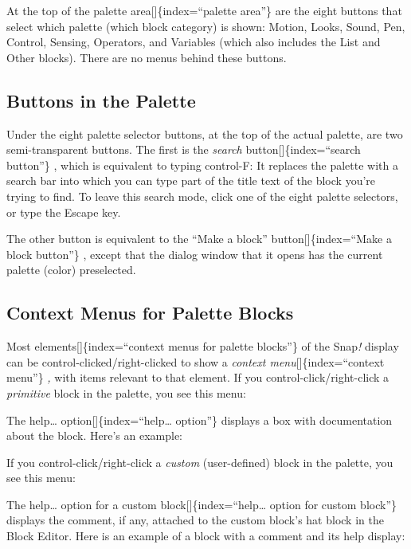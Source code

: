 \documentclass[
  letterpaper,
]{book}
\begin{document}
At the top of the palette area{[}{]}\{index=``palette area''\} are the
eight buttons that select which palette (which block category) is shown:
Motion, Looks, Sound, Pen, Control, Sensing, Operators, and Variables
(which also includes the List and Other blocks). There are no menus
behind these buttons.

\subsection{Buttons in the Palette}\label{buttons-in-the-palette}

Under the eight palette selector buttons, at the top of the actual
palette, are two semi-transparent buttons. The first is the
\emph{search} button{[}{]}\{index=``search button''\} , which is
equivalent to typing control-F: It replaces the palette with a search
bar into which you can type part of the title text of the block you're
trying to find. To leave this search mode, click one of the eight
palette selectors, or type the Escape key.

The other button is equivalent to the ``Make a block''
button{[}{]}\{index=``Make a block button''\} , except that the dialog
window that it opens has the current palette (color) preselected.

\subsection{Context Menus for Palette
Blocks}\label{context-menus-for-palette-blocks}

Most elements{[}{]}\{index=``context menus for palette blocks''\} of the
Snap\emph{!} display can be control-clicked/right-clicked to show a
\emph{context menu}{[}{]}\{index=``context menu''\} \emph{,} with items
relevant to that element. If you control-click/right-click a
\emph{primitive} block in the palette, you see this menu:

The help\ldots{} option{[}{]}\{index=``help\ldots{} option''\} displays
a box with documentation about the block. Here's an example:

If you control-click/right-click a \emph{custom} (user-defined) block in
the palette, you see this menu:

The help\ldots{} option for a custom block{[}{]}\{index=``help\ldots{}
option for custom block''\} displays the comment, if any, attached to
the custom block's hat block in the Block Editor. Here is an example of
a block with a comment and its help display:
\end{document}
